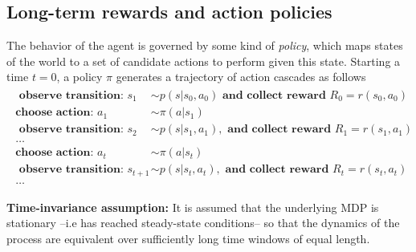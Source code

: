 \documentclass[10pt,letterpaper]{article}
\begin{document}
\subsection{Long-term rewards and action policies}
The behavior of the agent is governed by some kind of \textit{policy},
which maps states of the world to
a set of candidate actions to perform given this state. Starting a time $t=0$,
a policy $\pi$ generates a trajectory of action cascades as follows
\begin{eqnarray*}
  \begin{split}
    \textbf{ observe transition: }s_1 &\sim p(s|s_0,a_0)\textbf{ and collect reward }R_0 = r(s_0, a_0)\\
    \textbf{choose action: }a_1 &\sim \pi(a|s_1)\\
    \textbf{ observe transition: }s_2 &\sim p(s|s_1,a_1), \textbf{ and collect reward }R_1 = r(s_1, a_1)\\
    \ldots\\
    \textbf{choose action: }a_{t} &\sim \pi(a|s_{t})\\
    \textbf{ observe transition: }s_{t+1} &\sim p(s|s_{t},a_{t}), \textbf{ and collect reward }R_{t} = r(s_{t}, a_{t})\\
    \ldots
  \end{split}
\end{eqnarray*}

\begin{mdframed}
  \textbf{Time-invariance assumption:} It is assumed that the underlying MDP is stationary --i.e has reached steady-state conditions--
  so that the dynamics of the process are equivalent over sufficiently long time windows of equal length.
\end{mdframed}
\end{document}
